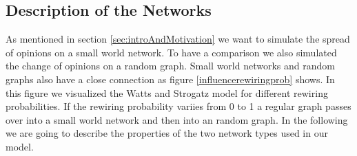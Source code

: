 \subsection{Description of the Networks}
\label{sec:descriptionofnetwork}
As mentioned in section \ref{sec:introAndMotivation} we want to simulate the spread of opinions on a small world network. To have a comparison we also simulated the change of opinions on a random graph. Small world networks and random graphs also have a close connection as figure \ref{influencerewiringprob} shows. In this figure we visualized the Watts and Strogatz model for different rewiring probabilities. If the rewiring probability variies from 0 to 1 a regular graph passes over into a small world network and then into an random graph. In the following we are going to describe the properties of the two network types used in our model.


